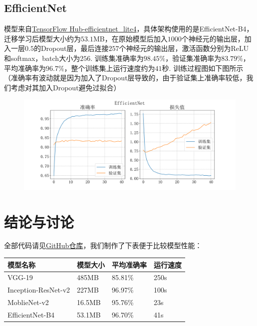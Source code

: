\documentclass[12pt, a4paper, oneside]{ctexart}
\numberwithin{equation}{section}  %
\begin{document}
\subsection{EfficientNet}
模型来自\href{https://tfhub.dev/tensorflow/efficientnet/lite4/classification/2}{TensorFlow Hub-efficientnet\_lite4}，具体架构使用的是EfficientNet-B4，迁移学习后模型大小约为$53.1$MB，在原始模型后加入$1000$个神经元的输出层，加入一层$0.5$的Dropout层，最后连接$257$个神经元的输出层，激活函数分别为ReLU和softmax，batch大小为$256$. 训练集准确率为$98.45\%$，验证集准确率为$83.79\%$，平均准确率为$96.7\%$，整个训练集上运行速度约为$41$秒. 训练过程图如下图所示（准确率有波动就是因为加入了Dropout层导致的，由于验证集上准确率较低，我们考虑对其加入Dropout避免过拟合）\vspace*{-0.3cm}
\begin{figure}[htbp]
  \hspace*{-0.8cm}
  \centering
  \includegraphics[scale=0.5]{model/efficientnet_dropout.png}
\end{figure}

\section{结论与讨论}
全部代码请见\href{}{GitHub仓库}，我们制作了下表便于比较模型性能：
\renewcommand\arraystretch{0.8} %
\begin{table}[!htbp] %
    \centering %
    \begin{tabular}{p{4cm}<{\centering}p{3cm}<{\centering}p{3cm}<{\centering}p{3cm}<{\centering}} %
        \toprule
      \textbf{模型名称}       & \textbf{模型大小} & \textbf{平均准确率} & \textbf{运行速度} \\
        \midrule
VGG-19              & 485MB         & 85.81\%       & 250s          \\
Inception-ResNet-v2 & 227MB         & 96.97\%        & 100s          \\
MoblieNet-v2        & 16.5MB        & 95.76\%        & 23s           \\
EfficientNet-B4     & 53.1MB        & 96.70\%         & 41s         \\
        \bottomrule
    \end{tabular}
\end{table}
\end{document}
